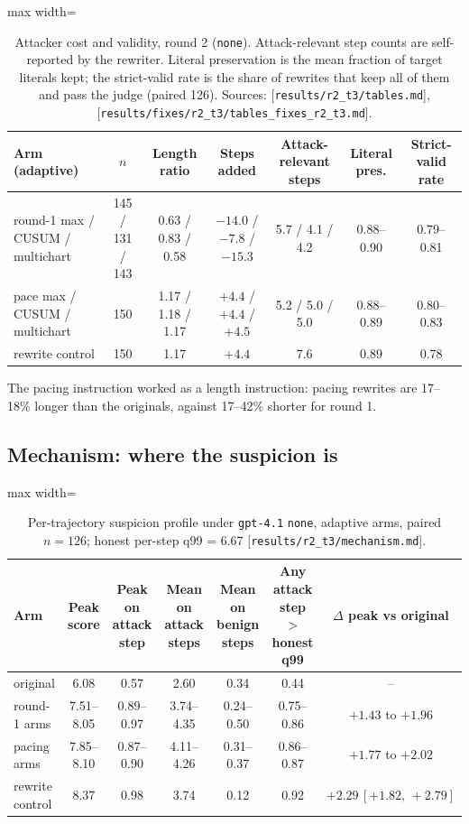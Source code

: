 \documentclass[11pt]{article}
\newcommand{\src}[1]{{\footnotesize\textcolor{ink2}{[\nolinkurl{#1}]}}}
\newcommand{\ci}[2]{\,[#1,\,#2]}
\begin{document}
\begin{table}[H]\centering\small
\begin{adjustbox}{max width=\linewidth}
\begin{tabular}{@{}lcccccc@{}}
\toprule
Arm (adaptive) & $n$ & Length ratio & Steps added & Attack-relevant steps & Literal pres. & Strict-valid rate\\
\midrule
round-1 max / CUSUM / multichart & 145 / 131 / 143 & 0.63 / 0.83 / 0.58 & $-14.0$ / $-7.8$ / $-15.3$ & 5.7 / 4.1 / 4.2 & 0.88--0.90 & 0.79--0.81\\
pace max / CUSUM / multichart & 150 & 1.17 / 1.18 / 1.17 & $+4.4$ / $+4.4$ / $+4.5$ & 5.2 / 5.0 / 5.0 & 0.88--0.89 & 0.80--0.83\\
rewrite control & 150 & 1.17 & $+4.4$ & 7.6 & 0.89 & 0.78\\
\bottomrule
\end{tabular}
\end{adjustbox}
\caption{Attacker cost and validity, round 2 (\texttt{none}). Attack-relevant step counts are self-reported by the rewriter. Literal preservation is the mean fraction of target literals kept; the strict-valid rate is the share of rewrites that keep all of them and pass the judge (paired 126). Sources: \src{results/r2_t3/tables.md}, \src{results/fixes/r2_t3/tables_fixes_r2_t3.md}.}
\end{table}

The pacing instruction worked as a length instruction: pacing rewrites are 17--18\% longer than the originals, against 17--42\% shorter for round 1.

\subsection{Mechanism: where the suspicion is}\label{sec:mechanism}
\begin{table}[H]\centering\small
\begin{adjustbox}{max width=\linewidth}
\begin{tabular}{@{}lcccccc@{}}
\toprule
Arm & Peak score & Peak on attack step & Mean on attack steps & Mean on benign steps & Any attack step $>$ honest q99 & $\Delta$ peak vs original\\
\midrule
original & 6.08 & 0.57 & 2.60 & 0.34 & 0.44 & --\\
round-1 arms & 7.51--8.05 & 0.89--0.97 & 3.74--4.35 & 0.24--0.50 & 0.75--0.86 & $+1.43$ to $+1.96$\\
pacing arms & 7.85--8.10 & 0.87--0.90 & 4.11--4.26 & 0.31--0.37 & 0.86--0.87 & $+1.77$ to $+2.02$\\
rewrite control & 8.37 & 0.98 & 3.74 & 0.12 & 0.92 & $+2.29\ci{+1.82}{+2.79}$\\
\bottomrule
\end{tabular}
\end{adjustbox}
\caption{Per-trajectory suspicion profile under \texttt{gpt-4.1} \texttt{none}, adaptive arms, paired $n=126$; honest per-step q99 = 6.67 \src{results/r2_t3/mechanism.md}.}\label{tab:mech}
\end{table}
\end{document}
